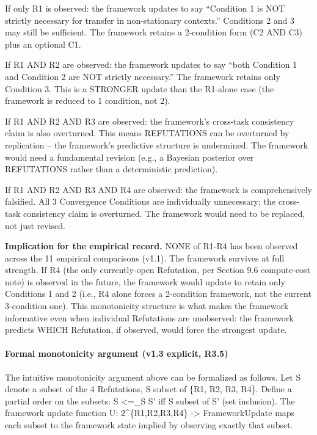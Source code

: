 \documentclass[11pt]{article}
\begin{document}
If only R1 is observed: the framework updates to say ``Condition 1 is
NOT strictly necessary for transfer in non-stationary contexts.''
Conditions 2 and 3 may still be sufficient. The framework retains a
2-condition form (C2 AND C3) plus an optional C1.

If R1 AND R2 are observed: the framework updates to say ``both Condition
1 and Condition 2 are NOT strictly necessary.'' The framework retains
only Condition 3. This is a STRONGER update than the R1-alone case (the
framework is reduced to 1 condition, not 2).

If R1 AND R2 AND R3 are observed: the framework's cross-task consistency
claim is also overturned. This means REFUTATIONS can be overturned by
replication -- the framework's predictive structure is undermined. The
framework would need a fundamental revision (e.g., a Bayesian posterior
over REFUTATIONS rather than a deterministic prediction).

If R1 AND R2 AND R3 AND R4 are observed: the framework is
comprehensively falsified. All 3 Convergence Conditions are individually
unnecessary; the cross-task consistency claim is overturned. The
framework would need to be replaced, not just revised.

\textbf{Implication for the empirical record.} NONE of R1-R4 has been
observed across the 11 empirical comparisons (v1.1). The framework
survives at full strength. If R4 (the only currently-open Refutation,
per Section 9.6 compute-cost note) is observed in the future, the
framework would update to retain only Conditions 1 and 2 (i.e., R4 alone
forces a 2-condition framework, not the current 3-condition one). This
monotonicity structure is what makes the framework informative even when
individual Refutations are unobserved: the framework predicts WHICH
Refutation, if observed, would force the strongest update.

\paragraph{Formal monotonicity argument (v1.3 explicit,
R3.5)}\label{formal-monotonicity-argument-v1.3-explicit-r3.5}

The intuitive monotonicity argument above can be formalized as follows.
Let S denote a subset of the 4 Refutations, S subset of \{R1, R2, R3,
R4\}. Define a partial order on the subsets: S \textless=\_S S' iff S
subset of S' (set inclusion). The framework update function U:
2\^{}\{R1,R2,R3,R4\} -\textgreater{} FrameworkUpdate maps each subset to
the framework state implied by observing exactly that subset.
\end{document}
